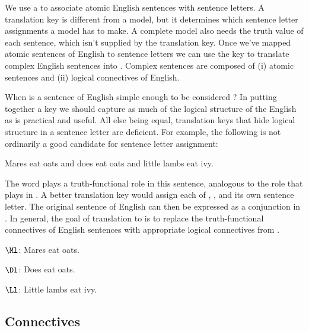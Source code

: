 We use a  to associate atomic English sentences with \GSL{} sentence letters.
A translation key is different from a model, but it determines which sentence letter assignments a \GSL{} model has to make.
A complete model also needs the truth value of each sentence, which isn't supplied by the translation key.
Once we've mapped atomic sentences of English to sentence letters we can use the key to translate complex English sentences into \GSL{}.
Complex sentences are composed of (i) atomic sentences and (ii) logical connectives of English.

When is a sentence of English simple enough to be considered ?
In putting together a key we should capture as much of the logical structure of the English as is practical and useful.  
All else being equal, translation keys that hide logical structure in a sentence letter are deficient.
For example, the following is not ordinarily a good candidate for sentence letter assignment:

\begin{smenumerate}
	\item Mares eat oats and does eat oats and little lambs eat ivy.
\end{smenumerate}

\noindent{}The word  plays a truth-functional role in this sentence, analogous to the role that \mention{$\WEDGE$} plays in \GSL{}.
A better translation key would assign each of , , and  its own sentence letter.
The original sentence of English can then be expressed as a conjunction in \GSL{}.
In general, the goal of translation to \GSL{} is to replace the truth-functional connectives of English sentences with appropriate logical connectives from \GSL{}.


\begin{description}[itemsep=0em]
	\item[Translation Key:] \hfill{} 
	\begin{description}[itemsep=0em]
		\item $\Ml$: Mares eat oats.
		\item $\Dl$: Does eat oats.
		\item $\Ll$: Little lambs eat ivy.
	\end{description} 
\end{description}

\subsection{Connectives}\label{GSLConnectives and Trans}

